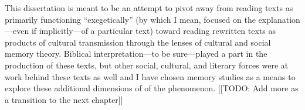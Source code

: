 

 This dissertation is meant to be an attempt to pivot away from reading \rwb texts as primarily functioning ``exegetically'' (by which I mean, focused on the explanation---even if implicitly---of a particular text) toward reading rewritten texts as products of cultural transmission through the lenses of cultural and social memory theory. Biblical interpretation---to be sure---played a part in the production of these texts, but other social, cultural, and literary forces were at work behind these texts as well and I have chosen memory studies as a means to explore these additional dimensions of of the \rwb phenomenon. [[TODO: Add more as a transition to the next chapter]]